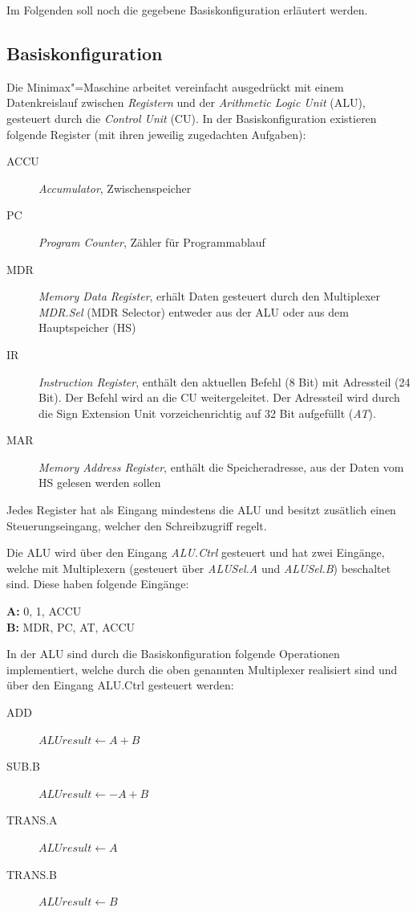 Im Folgenden soll noch die gegebene Basiskonfiguration erläutert werden.

\subsection{Basiskonfiguration}
\label{subsection:Pflichtenheft-Istzustand-Simulator-Basiskonfiguration}

Die Minimax"=Maschine arbeitet vereinfacht ausgedrückt mit einem Datenkreislauf zwischen \emph{Registern} und der \emph{Arithmetic Logic Unit} (ALU), gesteuert durch die \emph{Control Unit} (CU). In der Basiskonfiguration existieren folgende Register (mit ihren jeweilig zugedachten Aufgaben):

\begin{description}
    \item[ACCU] \emph{Accumulator}, Zwischenspeicher
    \item[PC] \emph{Program Counter}, Zähler für Programmablauf
    \item[MDR] \emph{Memory Data Register}, erhält Daten gesteuert durch den Multiplexer \emph{MDR.Sel} (MDR Selector) entweder aus der ALU oder aus dem Hauptspeicher (HS)
    \item[IR] \emph{Instruction Register}, enthält den aktuellen Befehl (8 Bit) mit Adressteil (24 Bit). Der Befehl wird an die CU weitergeleitet. Der Adressteil wird durch die Sign Extension Unit vorzeichenrichtig auf 32 Bit aufgefüllt (\emph{AT}).
    \item[MAR] \emph{Memory Address Register}, enthält die Speicheradresse, aus der Daten vom HS gelesen werden sollen
\end{description}

Jedes Register hat als Eingang mindestens die ALU und besitzt zusätlich einen Steuerungseingang, welcher den Schreibzugriff regelt.

Die ALU wird über den Eingang \emph{ALU.Ctrl} gesteuert und  hat zwei Eingänge, welche mit Multiplexern (gesteuert über \emph{ALUSel.A} und \emph{ALUSel.B}) beschaltet sind. Diese haben folgende Eingänge:

\textbf{A:} 0, 1, ACCU\\
\textbf{B:} MDR, PC, AT, ACCU

In der ALU sind durch die Basiskonfiguration folgende Operationen implementiert, welche durch die oben genannten Multiplexer realisiert sind und über den Eingang ALU.Ctrl gesteuert werden:

\begin{description}
    \item[ADD] $ALUresult \gets A + B$
    \item[SUB.B] $ALUresult \gets -A + B$
    \item[TRANS.A] $ALUresult \gets A$
    \item[TRANS.B] $ALUresult \gets B$
\end{description}

